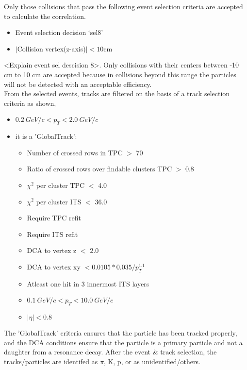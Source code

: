 \documentclass[12pt,a4paper,twoside]{report}
\begin{document}
Only those collisions that pass the following event selection criteria are accepted to calculate the correlation.
\begin{itemize}[label=$\bullet$]
	\item Event selection decision `sel8'
	\item $|$Collision vertex(z-axis)$| < 10$cm
\end{itemize}
<Explain event sel descision 8>. Only collisions with their centers between -10 cm to 10 cm are accepted because in collisions beyond this range the particles will not be detected with an acceptable efficiency.\\

From the selected events, tracks are filtered on the basis of a track selection criteria as shown,
\begin{itemize}[label=$\bullet$]
	\item $0.2\ GeV/c<p_T<2.0\ GeV/c$
	\item it is a 'GlobalTrack':
	\begin{itemize}
		\item Number of crossed rows in TPC $>$ 70
		\item Ratio of crossed rows over findable clusters TPC $>$ 0.8
		\item $\chi^2$ per cluster TPC $<$ 4.0
		\item $\chi^2$ per cluster ITS $<$ 36.0
		\item Require TPC refit
		\item Require ITS refit
		\item DCA to vertex z $<$ 2.0
		\item DCA to vertex xy  $<0.0105*0.035/p_T^{1.1}$
		\item Atleast one hit in 3 innermost ITS layers
		\item $0.1\ GeV/c<p_T<10.0\ GeV/c$
		\item $|\eta|<0.8$
	\end{itemize}
\end{itemize}
The 'GlobalTrack' criteria ensures that the particle has been tracked properly, and the DCA conditions ensure that the particle is a primary particle and not a daughter from a resonance decay.
After the event \& track selection, the tracks/particles are identifed as $\pi$, K, p, or as unidentified/others.
\end{document}
